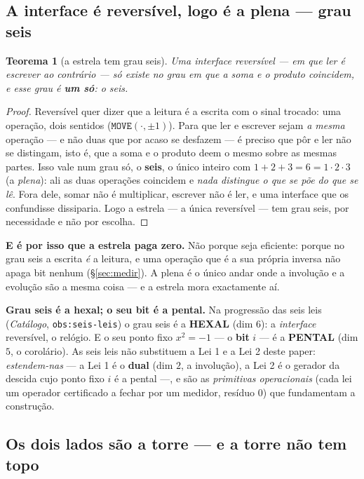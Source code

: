 \documentclass[11pt,a4paper]{article}
\newcommand{\code}[1]{\texttt{\small #1}}
\newtheorem{teorema}{Teorema}
\begin{document}
\subsection*{A interface é reversível, logo é a plena --- grau seis}

\begin{teorema}[a estrela tem grau seis]\label{thm:estrelaseis}
Uma interface reversível --- em que \emph{ler é escrever ao contrário} --- só existe no grau em que a
soma e o produto coincidem, e esse grau é \textbf{um só}: o seis.
\end{teorema}

\begin{proof}
Reversível quer dizer que a leitura é a escrita com o sinal trocado: uma operação, dois sentidos
($\texttt{MOVE}(\cdot,\pm1)$). Para que ler e escrever sejam \emph{a mesma} operação --- e não duas
que por acaso se desfazem --- é preciso que pôr e ler não se distingam, isto é, que a soma e o
produto deem o mesmo sobre as mesmas partes. Isso vale num grau só, o \textbf{seis}, o único inteiro
com $1+2+3=6=1\cdot2\cdot3$ (a \emph{plena}): ali as duas operações coincidem e \emph{nada distingue
o que se põe do que se lê}. Fora dele, somar não é multiplicar, escrever não é ler, e uma interface
que os confundisse dissiparia. Logo a estrela --- a única reversível --- tem grau seis, por
necessidade e não por escolha.
\end{proof}

\noindent \textbf{E é por isso que a estrela paga zero.} Não porque seja eficiente: porque no grau
seis a escrita \emph{é} a leitura, e uma operação que é a sua própria inversa não apaga bit nenhum
(§\ref{sec:medir}). A plena é o único andar onde a involução e a evolução são a mesma coisa --- e a
estrela mora exactamente aí.

\noindent \textbf{Grau seis é a hexal; o seu bit é a pental.} Na progressão das seis leis (\emph{Catálogo},
\code{obs:seis-leis}) o grau seis é a \textbf{HEXAL} (dim $6$): a \emph{interface} reversível, o relógio.
E o seu ponto fixo $x^2=-1$ --- o \textbf{bit} $i$ --- é a \textbf{PENTAL} (dim $5$, o corolário). As seis
leis não substituem a Lei 1 e a Lei 2 deste paper: \emph{estendem-nas} --- a Lei 1 é o \textbf{dual}
(dim $2$, a involução), a Lei 2 é o gerador da descida cujo ponto fixo $i$ é a pental ---, e são as
\emph{primitivas operacionais} (cada lei um operador certificado a fechar por um medidor, resíduo $0$)
que fundamentam a construção.

\subsection*{Os dois lados são a torre --- e a torre não tem topo}
\end{document}
